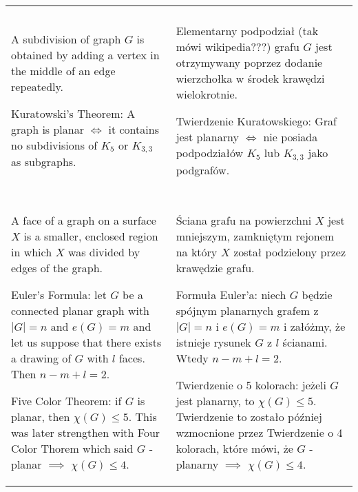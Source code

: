 \begin{tabularx}{\textwidth}{ X!{\color{git90gray}\vrule} X}
    & \\

    \hline

    & \\

    A {\color{def}subdivision} of graph $G$ is obtained by adding a vertex in the middle of an edge repeatedly. 
    \medskip

    {\color{def}Kuratowski's Theorem}: A graph is planar $\iff$ it contains no subdivisions of $K_5$ or $K_{3,3}$ as subgraphs.

    &
    {\color{def}Elementarny podpodział} (tak mówi wikipedia???) grafu $G$ jest otrzymywany poprzez dodanie wierzchołka w środek krawędzi wielokrotnie.
    \medskip

    {\color{def}Twierdzenie Kuratowskiego}: Graf jest planarny $\iff$ nie posiada podpodziałów $K_5$ lub $K_{3,3}$ jako podgrafów.\\

    & \\

    \hline
    
    & \\

    A {\color{def}face} of a graph on a surface $X$ is a smaller, enclosed region in which $X$ was divided by edges of the graph.
    \medskip

    {\color{def}Euler's Formula}: let $G$ be a connected planar graph with $|G|=n$ and $e(G)=m$ and let us suppose that there exists a drawing of $G$ with $l$ faces. Then $n-m+l=2$.
    \medskip

    {\color{def}Five Color Theorem}: if $G$ is planar, then $\chi(G)\leq 5$. This was later strengthen with {\color{def} Four Color Thorem} which said $G$ - planar $\implies$ $\chi(G)\leq4$.

    &
    
    {\color{def}Ściana} grafu na powierzchni $X$ jest mniejszym, zamkniętym rejonem na który $X$ został podzielony przez krawędzie grafu.
    \medskip

    {\color{def}Formuła Euler'a}: niech $G$ będzie spójnym planarnych grafem z $|G|=n$ i $e(G)=m$ i załóżmy, że istnieje rysunek $G$ z $l$ ścianami. Wtedy $n-m+l=2$.
    \medskip

    {\color{def}Twierdzenie o 5 kolorach}: jeżeli $G$ jest planarny, to $\chi(G)\leq5$. Twierdzenie to zostało później wzmocnione przez {\color{def}Twierdzenie o 4 kolorach}, które mówi, że $G$ - planarny $\implies$ $\chi(G)\leq4$.

\end{tabularx}


